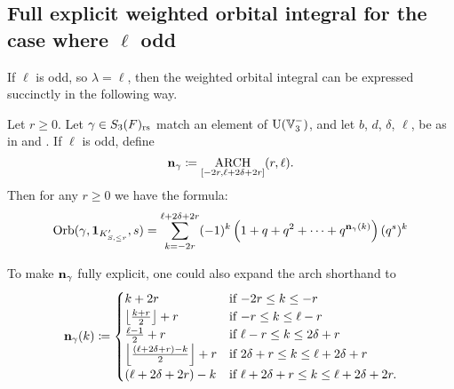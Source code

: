 \subsection{Full explicit weighted orbital integral for the case where $\ell$ odd}
If $\ell$ is odd, so $\lambda = \ell$, then
the weighted orbital integral can be expressed succinctly in the following way.
\begin{theorem}
  \label{thm:full_orbital_ell_odd}
  Let $r \ge 0$.
  Let $\gamma \in S_3(F)_{\mathrm{rs}}$ match an element of $\operatorname{U}(\mathbb V_3^-)$,
  and let $b$, $d$, $\delta$, $\ell$, be as in
   and .
  If $\ell$ is odd, define
  \[ \mathbf n_\gamma \coloneqq \operatorname*{ARCH}_{[-2r, \ell + 2\delta + 2r]}(r, \ell). \]
  Then for any $r \ge 0$ we have the formula:
  \[
    \operatorname{Orb}(\gamma, \mathbf{1}_{K'_{S, \le r}}, s)
    = \sum_{k = -2r}^{\ell + 2\delta + 2r}
    (-1)^k \left( 1 + q + q^2 + \dots + q^{\mathbf n_{\gamma}(k)}  \right) (q^s)^k
  \]
\end{theorem}
\begin{remark}
  To make $\mathbf n_\gamma$ fully explicit, one could also expand the arch shorthand to
  \[
    \mathbf n_\gamma(k)
    \coloneqq \begin{cases}
      k + 2r & \text{if } {-2r} \le k \le -r \\
      \left\lfloor \frac{k+r}{2} \right\rfloor + r & \text{if }{-r} \le k \le \ell-r \\
      \frac{\ell-1}{2} + r & \text{if } \ell - r \le k \le 2\delta + r \\
      \left\lfloor \frac{(\ell+2\delta+r)-k}{2} \right\rfloor + r & \text{if } 2\delta + r \le k \le \ell + 2\delta + r\\
      (\ell + 2\delta + 2r) - k & \text{if } \ell + 2\delta + r \le k \le \ell + 2\delta + 2r.
    \end{cases} \]
\end{remark}


